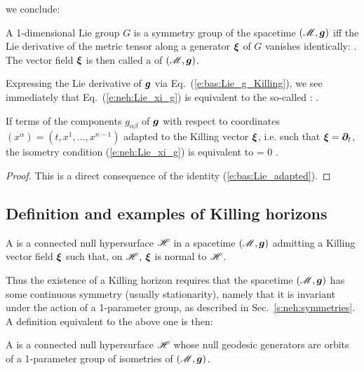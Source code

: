 we conclude:
\begin{prop}
A 1-dimensional Lie group $G$
is a symmetry group of the spacetime $(\mathscr{M},\bm{g})$ iff the Lie derivative
of the metric tensor along a generator $\bm{\xi}$ of $G$
vanishes identically:
\be \label{e:neh:Lie_xi_g}
     .
\ee
The vector field $\bm{\xi}$ is then called a 
of $(\mathscr{M},\bm{g})$.
\end{prop}
Expressing the Lie derivative of $\bm{g}$ via Eq.~(\ref{e:bas:Lie_g_Killing}),
we see immediately that Eq.~(\ref{e:neh:Lie_xi_g}) is equivalent to the so-called
:
\be \label{e:neh:Killing_equation}
    .
\ee

If terms of the components $g_{\alpha\beta}$ of $\bm{g}$ with respect to
coordinates $(x^\alpha) = (t,x^1,\ldots,x^{n-1})$ adapted to the Killing vector $\bm{\xi}$,
i.e. such that $\bm{\xi} = \bm{\partial}_t$, the isometry condition (\ref{e:neh:Lie_xi_g})
is equivalent to
\be \label{e:neh:dgabdt_zero}
     = 0 .
\ee
\begin{proof}
This is a direct consequence of the identity (\ref{e:bas:Lie_adapted}).
\end{proof}


\subsection{Definition and examples of Killing horizons} \label{s:neh:def_Killing_hor}

\begin{greybox}
A  is
a connected null hypersurface $\mathscr{H}$ in a spacetime $(\mathscr{M},\bm{g})$ admitting a
Killing vector field $\bm{\xi}$ such that, on $\mathscr{H}$, $\bm{\xi}$ is
normal to $\mathscr{H}$.
\end{greybox}

Thus the existence of a Killing horizon requires that the spacetime $(\mathscr{M},\bm{g})$ has
some continuous symmetry
(usually stationarity), namely that it is invariant under the action of a
1-parameter group, as described in Sec.~\ref{s:neh:symmetries}.
A definition equivalent to the above one is then:
\begin{greybox}
A  is a connected null
hypersurface $\mathscr{H}$ whose null geodesic generators are orbits of a
1-parameter group of isometries of $(\mathscr{M},\bm{g})$.
\end{greybox}

